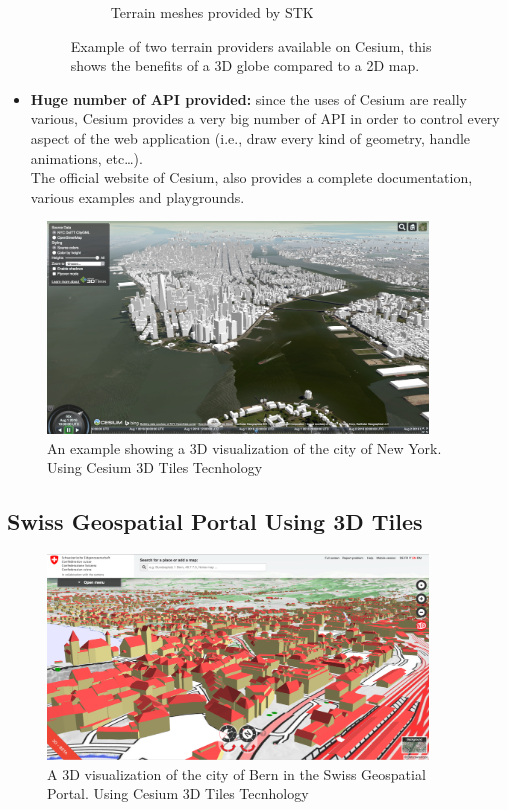 \begin{itemize}
\begin{figure} [H]
\begin{subfigure}[b]{0.3\textwidth}
			\caption{Terrain meshes provided by STK}
			\label{fig:3D-Map}
		\end{subfigure}
		\caption{Example of two terrain providers available on Cesium, this shows the benefits of a 3D globe compared to a 2D map.}
	\end{figure}
	\item {\bf Huge number of API provided:} since the uses of Cesium are really various, Cesium provides a very big number of API in order to control every aspect of the web application (i.e., draw every kind of geometry, handle animations, etc\dots).\\The official website of Cesium, also provides a complete documentation, various examples and playgrounds.
\end{itemize}
\begin{center}
\end{center}
\begin{figure} [H]
\centering
\includegraphics[width=0.9\textwidth]{chapter2/images/NewYorkCityCesium3dTiles}
\caption{An example showing a 3D visualization of the city of New York. Using Cesium 3D Tiles Tecnhology}
\label{fig:NewYorkCityCesium3dTiles}
\end{figure}
\subsection{Swiss Geospatial Portal Using 3D Tiles}
\begin{center}
\end{center}


\begin{figure} [H]
\centering
\includegraphics[width=0.9\textwidth]{chapter2/images/BernCitySwissTopo}
\caption{A 3D visualization of the city of Bern in the Swiss Geospatial Portal. Using Cesium 3D Tiles Tecnhology}
\label{fig:BernCitySwissTopo}
\end{figure}